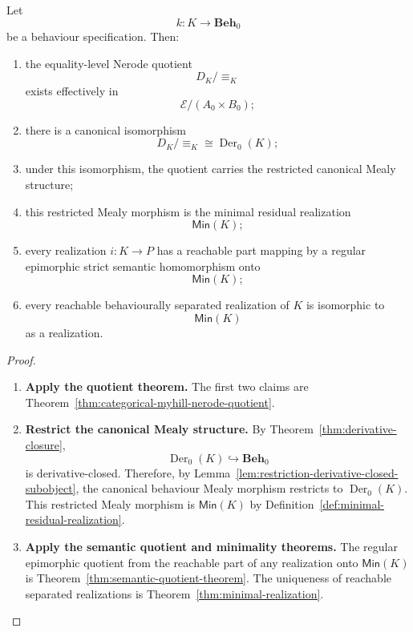 \begin{theorem}
\label{thm:categorical-myhill-nerode}
    Let
    \[
        k:K\to\mathbf{Beh}_0
    \]
    be a behaviour specification. Then:
    \begin{enumerate}
        \item the equality-level Nerode quotient
        \[
            D_K/{\equiv_K}
        \]
        exists effectively in
        \[
            \mathcal E/(A_0\times B_0);
        \]

        \item there is a canonical isomorphism
        \[
            D_K/{\equiv_K}\cong\operatorname{Der}_0(K);
        \]

        \item under this isomorphism, the quotient carries the restricted canonical Mealy structure;

        \item this restricted Mealy morphism is the minimal residual realization
        \[
            \mathsf{Min}(K);
        \]

        \item every realization \(i:K\to P\) has a reachable part mapping by a regular epimorphic strict semantic homomorphism onto
        \[
            \mathsf{Min}(K);
        \]

        \item every reachable behaviourally separated realization of \(K\) is isomorphic to
        \[
            \mathsf{Min}(K)
        \]
        as a realization.
    \end{enumerate}
\end{theorem}
\begin{proof}
    \leavevmode
    \begin{enumerate}
        \item \textbf{Apply the quotient theorem.} The first two claims are Theorem~\ref{thm:categorical-myhill-nerode-quotient}.

        \item \textbf{Restrict the canonical Mealy structure.} By Theorem~\ref{thm:derivative-closure},
        \[
            \operatorname{Der}_0(K)\hookrightarrow\mathbf{Beh}_0
        \]
        is derivative-closed. Therefore, by Lemma~\ref{lem:restriction-derivative-closed-subobject}, the canonical behaviour Mealy morphism restricts to \(\operatorname{Der}_0(K)\). This restricted Mealy morphism is \(\mathsf{Min}(K)\) by Definition~\ref{def:minimal-residual-realization}.

        \item \textbf{Apply the semantic quotient and minimality theorems.} The regular epimorphic quotient from the reachable part of any realization onto \(\mathsf{Min}(K)\) is Theorem~\ref{thm:semantic-quotient-theorem}. The uniqueness of reachable separated realizations is Theorem~\ref{thm:minimal-realization}.
    \end{enumerate}
\end{proof}

